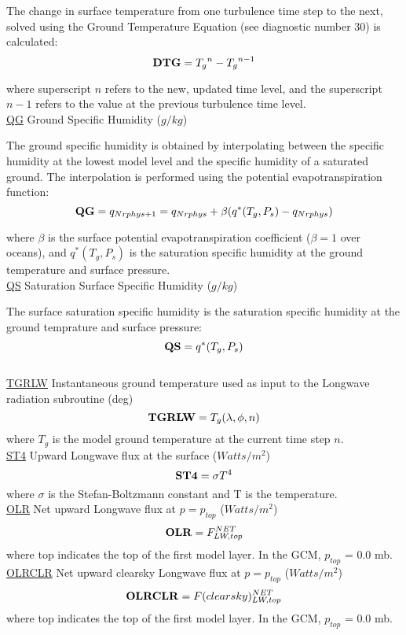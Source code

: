 \noindent
The change in surface temperature from one turbulence time step to the next, solved
using the Ground Temperature Equation (see diagnostic number 30) is calculated:
\[
{\bf DTG} = {T_g}^{n} - {T_g}^{n-1}
\]

\noindent
where superscript $n$ refers to the new, updated time level, and the superscript $n-1$
refers to the value at the previous turbulence time level.
\\
 
\noindent
{ \underline {QG}  Ground Specific Humidity ($g/kg$) }

\noindent
The ground specific humidity is obtained by interpolating between the specific
humidity at the lowest model level and the specific humidity of a saturated ground.
The interpolation is performed using the potential evapotranspiration function:
\[
{\bf QG} = q_{Nrphys+1} = q_{Nrphys} + \beta(q^*(T_g,P_s) - q_{Nrphys})
\]

\noindent
where $\beta$ is the surface potential evapotranspiration coefficient ($\beta=1$ over oceans), 
and $q^*(T_g,P_s)$ is the saturation specific humidity at the ground temperature and surface
pressure.
\\
 
\noindent
{ \underline {QS}  Saturation Surface Specific Humidity ($g/kg$) }

\noindent
The surface saturation specific humidity is the saturation specific humidity at
the ground temprature and surface pressure:
\[
{\bf QS} = q^*(T_g,P_s)
\]
\\
 
\noindent
{ \underline {TGRLW} Instantaneous ground temperature used as input to the Longwave
 radiation subroutine (deg)}
\[
{\bf TGRLW}  = T_g(\lambda , \phi ,n)
\]
\noindent
where $T_g$ is the model ground temperature at the current time step $n$.
\\
 
 
\noindent
{ \underline {ST4} Upward Longwave flux at the surface ($Watts/m^2$) }
\[
{\bf ST4} = \sigma T^4
\]
\noindent
where $\sigma$ is the Stefan-Boltzmann constant and T is the temperature.
\\
 
\noindent
{ \underline {OLR} Net upward Longwave flux at $p=p_{top}$ ($Watts/m^2$) }
\[
{\bf OLR}  =  F_{LW,top}^{NET}
\]
\noindent
where top indicates the top of the first model layer.
In the GCM, $p_{top}$ = 0.0 mb.
\\


\noindent
{ \underline {OLRCLR} Net upward clearsky Longwave flux at $p=p_{top}$ ($Watts/m^2$) }
\[
{\bf OLRCLR}  =  F(clearsky)_{LW,top}^{NET}
\]
\noindent
where top indicates the top of the first model layer.
In the GCM, $p_{top}$ = 0.0 mb.
\\

